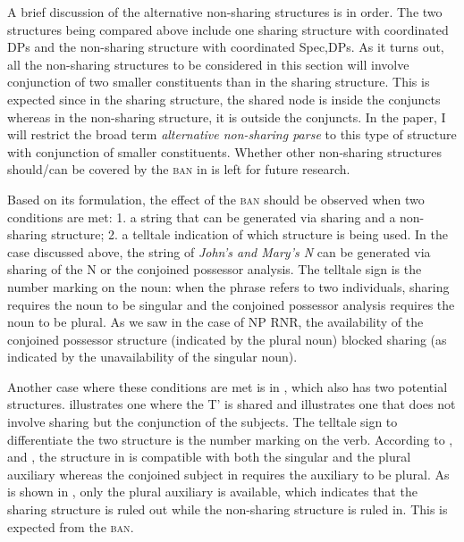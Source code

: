 \documentclass[output=paper]{langscibook}
\begin{document}
A brief discussion of the alternative non-sharing structures is in order. The two structures being compared above include one sharing structure with coordinated DPs and the non-sharing structure with coordinated Spec,DPs. As it turns out, all the non-sharing structures to be considered in this section will involve conjunction of two smaller constituents than in the sharing structure. This is expected since in the sharing structure, the shared node is inside the conjuncts whereas in the non-sharing structure, it is outside the conjuncts. In the paper, I will restrict the broad term \emph{alternative non-sharing parse} to this type of structure with conjunction of smaller constituents. Whether other non-sharing structures should/can be covered by the \textsc{ban} in  is left for future research.

Based on its formulation, the effect of the \textsc{ban} should be observed when two conditions are met: 1. a string that can be generated via sharing and a non-sharing structure; 2. a telltale indication of which structure is being used. In the case discussed above, the string of \emph{John's and Mary's N} can be generated via sharing of the N or the conjoined possessor analysis. The telltale sign is the number marking on the noun: when the phrase refers to two individuals, sharing requires the noun to be singular and the conjoined possessor analysis requires the noun to be plural. As we saw in the case of NP RNR, the availability of the conjoined possessor structure (indicated by the plural noun) blocked sharing (as indicated by the unavailability of the singular noun).

Another case where these conditions are met is in , which also has two potential structures.  illustrates one where the T' is shared and  illustrates one that does not involve sharing but the conjunction of the subjects. The telltale sign to differentiate the two structure is the number marking on the verb. According to \citet{Kluck:2009, Grosz:2015}, and \citet{Shen:2019}, the structure in  is compatible with both the singular and the plural auxiliary whereas the conjoined subject in  requires the auxiliary to be plural. As is shown in , only the plural auxiliary is available, which indicates that the sharing structure  is ruled out while the non-sharing structure  is ruled in. This is expected from the \textsc{ban}.
\end{document}
